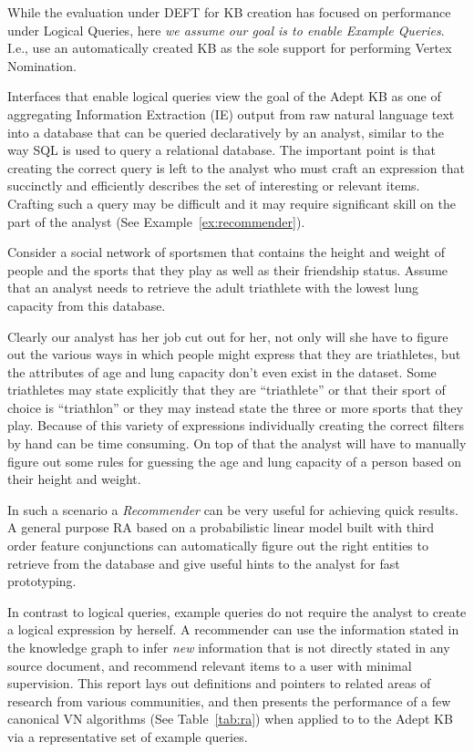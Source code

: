 \documentclass[paper=a4,fontsize=11pt]{scrartcl}
\newcommand{\Tabref}[1]{Table~\ref{#1}}
\newcommand{\Exref}[1]{Example~\ref{#1}}
\numberwithin{equation}{section}    %
\numberwithin{figure}{section}      %
\numberwithin{table}{section}       %
\begin{document}
While the evaluation under DEFT for KB creation has focused on
performance under Logical Queries, here \emph{we assume our goal is to
  enable Example Queries}.  I.e., use an
automatically created KB as the sole support for performing Vertex
Nomination.

Interfaces that enable logical queries view the goal of the
Adept KB as one of aggregating Information Extraction (IE) output from raw
natural language text into a database that can be queried declaratively by an
analyst, similar to the way SQL is used to query a relational database.
The important point is that creating the correct query is left to the analyst
who must craft an expression that succinctly and
efficiently describes the set of interesting or relevant items. Crafting
such a query may be difficult and it may require significant skill on the part of the
analyst (See \Exref{ex:recommender}).
\begin{example}\label{ex:recommender}
  Consider a social network of sportsmen that contains the height
  and weight of people and the sports that they play as well as their friendship
  status. Assume that an analyst needs to retrieve the adult triathlete
  with the lowest lung capacity from this database.

  Clearly our analyst has her job cut out for her, not only will she have to
  figure out the various ways in which people might express that they are
  triathletes, but the attributes of age and lung capacity don't even exist in
  the dataset. Some triathletes may state explicitly that they are
  ``triathlete'' or that their sport of choice is ``triathlon'' or they may
  instead state the three or more sports that they play. Because of this variety
  of expressions individually creating
  the correct filters by hand can be time consuming. On top of that the analyst
  will have to manually figure out some rules for guessing the age and lung capacity of
  a person  based on their height and weight.

  In such a scenario a \textit{Recommender} can be very useful for achieving quick
  results. A general purpose RA based on a probabilistic linear model built with
  third order feature conjunctions can automatically figure out the right
  entities to retrieve from the database and give useful hints to the analyst
  for fast prototyping.
\end{example}
In contrast to logical queries,
example queries do not require the analyst to create a
logical expression by herself. A recommender can use the information stated
in the knowledge graph to infer \textit{new} information that is not
directly stated in
any source document, and recommend relevant items to a user with
minimal supervision. This report lays out definitions and pointers to related areas of
research from various communities, and then presents the performance of
a few canonical VN algorithms (See \Tabref{tab:ra}) when applied to to the Adept
KB via a representative set of example queries.
\end{document}
